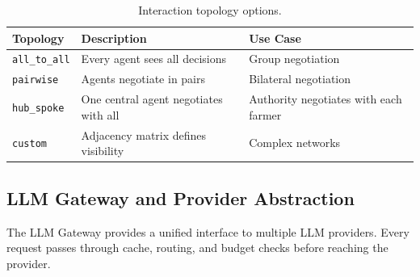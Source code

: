 \documentclass[12pt, a4paper]{article}
\begin{document}
\begin{table}[H]
\centering
\begin{tabularx}{\textwidth}{llX}
    \toprule
    \textbf{Topology} & \textbf{Description} & \textbf{Use Case} \\
    \midrule
    \texttt{all\_to\_all} & Every agent sees all decisions & Group negotiation \\
    \texttt{pairwise} & Agents negotiate in pairs & Bilateral negotiation \\
    \texttt{hub\_spoke} & One central agent negotiates with all & Authority negotiates with each farmer \\
    \texttt{custom} & Adjacency matrix defines visibility & Complex networks \\
    \bottomrule
\end{tabularx}
\caption{Interaction topology options.}
\label{tab:topologies}
\end{table}

\subsection{LLM Gateway and Provider Abstraction}

The LLM Gateway provides a unified interface to multiple LLM providers. Every request passes through cache, routing, and budget checks before reaching the provider.
\end{document}
